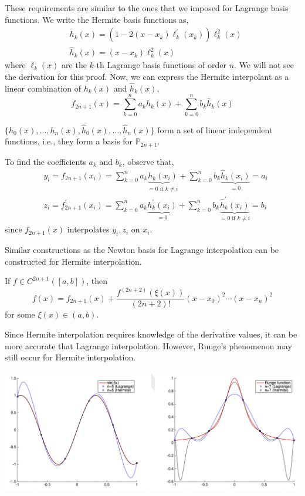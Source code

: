 \noindent These requirements are similar to the ones that we imposed for Lagrange basis functions. We write the Hermite basis functions as,
\begin{align*}
&h_k(x)=\left(1-2\left(x-x_k\right) \ell_k^{\prime}\left(x_k\right)\right) \ell_k^2(x) \\
&\hat{h}_k(x)=\left(x-x_k\right) \ell_k^2(x)
\end{align*}
where $\ell_k(x)$ are the $k$-th Lagrange basis functions of order $n$. We will not see the derivation for this proof. Now, we can express the Hermite interpolant as a linear combination of $h_k(x)$ and $\hat{h}_k(x)$,
\[f_{2 n+1}(x)=\sum_{k=0}^n a_k h_k(x)+\sum_{k=0}^n b_k \hat{h}_k(x)\]

\begin{marginfigure}
    $\{h_0(x), \ldots, h_n(x), \hat{h}_0(x), \ldots, \hat{h}_n(x)\}$ form a set of linear independent functions, i.e., they form a basis for $\mathbb{P}_{2 n+1}$.
\end{marginfigure}

\noindent To find the coefficients $a_k$ and $b_k$, observe that,
\begin{align*}
&y_i=f_{2 n+1}\left(x_i\right)=\sum_{k=0}^n a_k \underbrace{h_k\left(x_i\right)}_{=0 \text { if } k \neq i}+\sum_{k=0}^n b_k \underbrace{\hat{h}_k\left(x_i\right)}_{=0}=a_i \\
&z_i=f_{2 n+1}^{\prime}\left(x_i\right)=\sum_{k=0}^n a_k \underbrace{h_k^{\prime}\left(x_i\right)}_{=0}+\sum_{k=0}^n b_k \underbrace{\hat{h}_k^{\prime}\left(x_i\right)}_{=0 \text { if } k \neq i}=b_i
\end{align*}
since $f_{2 n+1}(x)$ interpolates  $y_i, z_i$ on $x_i$.

\begin{marginfigure}
    Similar constructions as the Newton basis for Lagrange interpolation can be constructed for Hermite interpolation.
\end{marginfigure}

\begin{thm}
    If $f \in C^{2n+1}([a,b])$, then 
    \[f(x)=f_{2 n+1}(x)+\frac{f^{(2 n+2)}(\xi(x))}{(2 n+2) !}\left(x-x_0\right)^2 \cdots\left(x-x_n\right)^2\]
    for some $\xi(x) \in (a,b)$.
\end{thm}

\noindent Since Hermite interpolation requires knowledge of the derivative values, it can be more accurate that Lagrange interpolation. However, Runge's phenomenon may still occur for Hermite interpolation.

\begin{center}
       \includegraphics[width=\textwidth]{figures/fig-21.png}
\end{center}